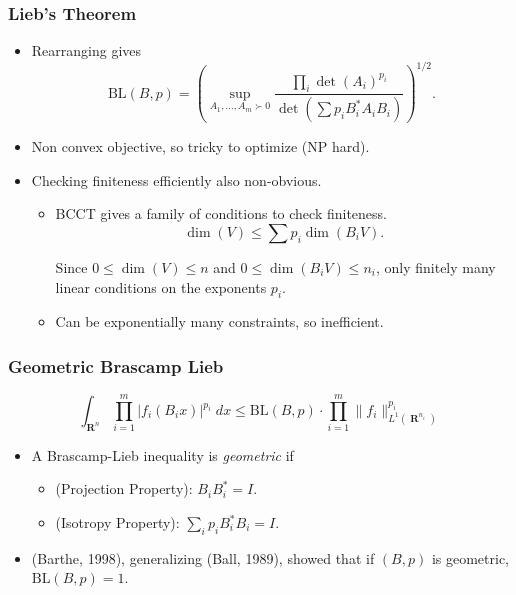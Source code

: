 \documentclass[usenames,dvipsnames,12pt]{beamer}
\DeclareMathOperator{\RR}{\mathbf{R}}
\begin{document}
\begin{frame}
    \frametitle{Lieb's Theorem}

    \begin{itemize}
        \item Rearranging gives
        \[ \text{BL}(B,p) = \left( \sup_{A_1,\dots,A_m \succ 0} \frac{\prod_i \det(A_i)^{p_i}}{\det(\sum p_i B_i^* A_i B_i)} \right)^{1/2}. \]

        \pause
        \item Non convex objective, so tricky to optimize (NP hard).

        \pause
        \item Checking finiteness efficiently also non-obvious.

        \begin{itemize}
            \pause
            \item BCCT gives a family of conditions to check finiteness.
            \[ \dim(V) \leq \sum p_i \dim(B_i V). \]
            
            \pause
            Since $0 \leq \dim(V) \leq n$ and $0 \leq \dim(B_i V) \leq n_i$, only finitely many linear conditions on the exponents $p_i$.
    
            \pause
            \item Can be exponentially many constraints, so inefficient.
        \end{itemize}
    \end{itemize}
\end{frame}

\begin{frame}
    \frametitle{Geometric Brascamp Lieb}

    \vspace{-1.5em}
    \[ \int_{\RR^n} \prod_{i = 1}^m |f_i(B_i x)|^{p_i}\; dx \leq \text{BL}(B,p) \cdot \prod_{i = 1}^m \| f_i \|_{L^1(\RR^{n_i})}^{p_i} \]

    \begin{itemize}
        \pause
        \item A Brascamp-Lieb inequality is \emph{geometric} if
        \begin{itemize}
            \item (Projection Property): $B_i B_i^* = I$.

            \item (Isotropy Property): $\sum_i p_i B_i^* B_i = I$.
        \end{itemize}

        \pause
        \item (Barthe, 1998), generalizing (Ball, 1989), showed that if $(B,p)$ is geometric, $\text{BL}(B,p) = 1$.
    \end{itemize}
\end{frame}
\end{document}

